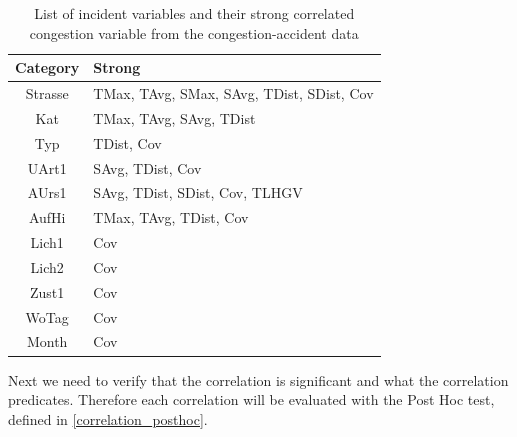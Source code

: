 \begin{table}[ht]
	\centering
	\begin{tabular}{c|l}  
		\toprule
		Category & Strong \\
		\midrule
		Strasse & TMax, TAvg, SMax, SAvg, TDist, SDist, Cov \\ 
 		Kat & TMax, TAvg, SAvg, TDist \\ 
 		Typ & TDist, Cov \\
 		UArt1 & SAvg, TDist, Cov \\
 		AUrs1 & SAvg, TDist, SDist, Cov, TLHGV \\
 		AufHi & TMax, TAvg, TDist, Cov \\
 		Lich1 & Cov \\
 		Lich2 & Cov \\
 		Zust1 & Cov \\
 		WoTag & Cov \\
		Month & Cov \\
		\bottomrule
	\end{tabular}
	\caption{List of incident variables and their strong correlated congestion variable from the congestion-accident data}
	\label{tbl:correlation_list_baysis_matched}
\end{table}

Next we need to verify that the correlation is significant and what the correlation predicates. Therefore each correlation will be evaluated with the Post Hoc test, defined in \autoref{correlation_posthoc}.


